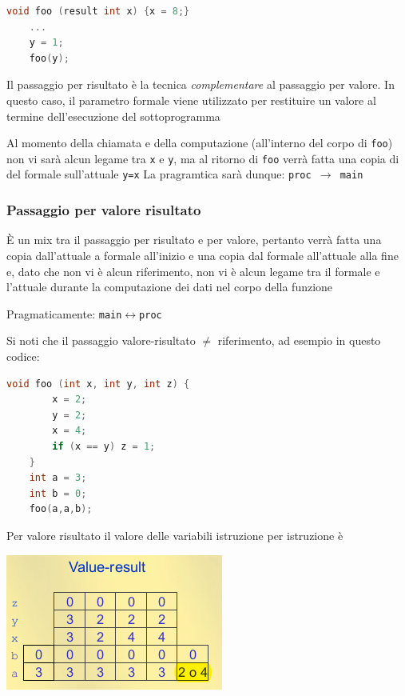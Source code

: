 \begin{lstlisting}[language=C]
    void foo (result int x) {x = 8;}
    ...
    y = 1;
    foo(y);
\end{lstlisting}

Il passaggio per risultato è la tecnica \textit{complementare} al passaggio per valore. In questo caso, il parametro formale viene utilizzato per restituire un valore al termine dell'esecuzione del sottoprogramma

Al momento della chiamata e della computazione (all'interno del corpo di \texttt{foo}) non vi sarà alcun legame tra \texttt{x} e \texttt{y}, ma al ritorno di \texttt{foo} verrà fatta una copia di del formale sull'attuale \texttt{y=x}
La pragramtica sarà dunque: \texttt{proc $\to$ main}

\subsubsection{Passaggio per valore risultato}
È un mix tra il passaggio per risultato e per valore, pertanto verrà fatta una copia dall'attuale a formale all'inizio e una copia dal formale all'attuale alla fine e, dato che non vi è alcun riferimento, non vi è alcun legame tra il formale e l'attuale durante la computazione dei dati nel corpo della funzione

Pragmaticamente: \texttt{main$\leftrightarrow$proc}


Si noti che il passaggio valore-risultato $\neq$ riferimento, ad esempio in questo codice:

\begin{lstlisting}[language=C]
    void foo (int x, int y, int z) {
        x = 2;
        y = 2;
        x = 4;
        if (x == y) z = 1;
    }
    int a = 3;
    int b = 0;
    foo(a,a,b);
\end{lstlisting}

Per valore risultato il valore delle variabili istruzione per istruzione è

\begin{center}
    \includegraphics{img/valueresult.png}
\end{center}

